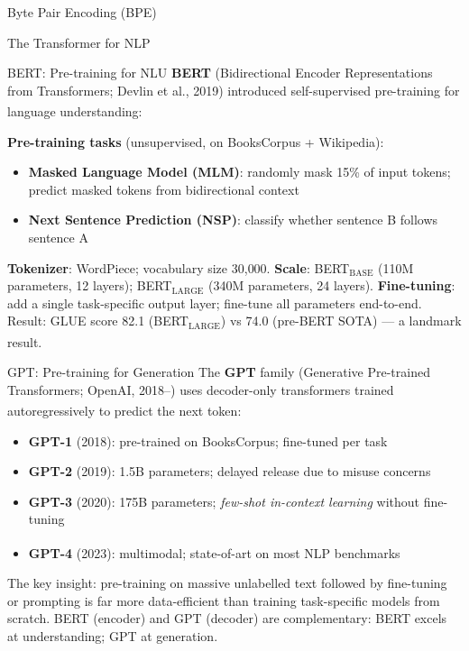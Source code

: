 \begin{v3topic}{Byte Pair Encoding (BPE)}
\begin{v3topic}{The Transformer for NLP}
\end{v3topic}
\begin{v3topic}{BERT: Pre-training for NLU}
    \textbf{BERT} (Bidirectional Encoder Representations from Transformers; Devlin et al., 2019) introduced self-supervised pre-training for language understanding\textsuperscript{\cite[][pp.~1--4]{devlinBERTPretrainingDeep2019}}:

    \textbf{Pre-training tasks} (unsupervised, on BooksCorpus + Wikipedia):
    \begin{itemize}
        \item \textbf{Masked Language Model (MLM)}: randomly mask 15\% of input tokens; predict masked tokens from bidirectional context
        \item \textbf{Next Sentence Prediction (NSP)}: classify whether sentence B follows sentence A
    \end{itemize}
    \textbf{Tokenizer}: WordPiece; vocabulary size 30{,}000.
    \textbf{Scale}: BERT$_\mathrm{BASE}$ (110M parameters, 12 layers); BERT$_\mathrm{LARGE}$ (340M parameters, 24 layers).
    \textbf{Fine-tuning}: add a single task-specific output layer; fine-tune all parameters end-to-end.
    Result: GLUE score 82.1 (BERT$_\mathrm{LARGE}$) vs 74.0 (pre-BERT SOTA) --- a landmark result\textsuperscript{\cite[][p.~5]{devlinBERTPretrainingDeep2019}}.

\end{v3topic}
\begin{v3topic}{GPT: Pre-training for Generation}
    The \textbf{GPT} family (Generative Pre-trained Transformers; OpenAI, 2018--) uses decoder-only transformers trained autoregressively to predict the next token\textsuperscript{\cite[][pp.~8--9]{dhamaniIntroductionGenerativeAI2024}}:
    \begin{itemize}
        \item \textbf{GPT-1} (2018): pre-trained on BooksCorpus; fine-tuned per task
        \item \textbf{GPT-2} (2019): 1.5B parameters; delayed release due to misuse concerns
        \item \textbf{GPT-3} (2020): 175B parameters; \emph{few-shot in-context learning} without fine-tuning
        \item \textbf{GPT-4} (2023): multimodal; state-of-art on most NLP benchmarks\textsuperscript{\cite[][]{openaiGPT4TechnicalReport2023}}
    \end{itemize}
    The key insight: pre-training on massive unlabelled text followed by fine-tuning or prompting is far more data-efficient than training task-specific models from scratch.
    BERT (encoder) and GPT (decoder) are complementary: BERT excels at understanding; GPT at generation.
\end{v3topic}


\end{v3topic}
